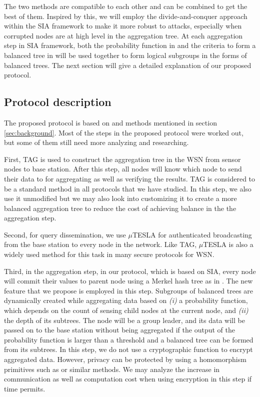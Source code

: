 \documentclass[a4paper]{article}
\begin{document}
The two methods are compatible to each other and can be combined to get the
best of them. Inspired by this, we will employ the divide-and-conquer approach
within the SIA framework to make it more robust to attacks, especially when
corrupted nodes are at high level in the aggregation tree. At each aggregation
step in SIA framework, both the probability function in \cite{Chan06} and the
criteria to form a balanced tree in \cite{SDAP} will be used together to form
logical subgroups in the forms of balanced trees. The next section will give a
detailed explanation of our proposed protocol.

\subsection{Protocol description}

The proposed protocol is based on \cite{Chan06} and methods mentioned
in section \ref{sec:background}. Most of the steps in the proposed protocol
were worked out, but some of them still need more analyzing and researching.

First, TAG \cite{tag} is used to construct the aggregation tree in the WSN
from sensor nodes to base station. After this step, all nodes will know which
node to send their data to for aggregating as well as verifying the
results. TAG is considered to be a standard method in all protocols that we
have studied. In this step, we also use it unmodified but we may also look
into customizing it to create a more balanced aggregation tree to reduce the
cost of achieving balance in the the aggregation step.

Second, for query dissemination, we use $\mu$TESLA \cite{SPINS} for
authenticated broadcasting from the base station to every node in the
network. Like TAG, $\mu$TESLA is also a widely used method for this task in
many secure protocols for WSN.

Third, in the aggregation step, in our protocol, which is based on SIA, every
node will commit their values to parent node using a Merkel hash tree
\cite{Merkel} as in \cite{SIA}. The new feature that we propose is employed in
this step.  Subgroups of balanced trees are dynamically created while
aggregating data based on {\it (i)} a probability function, which depends on
the count of sensing child nodes at the current node, and {\it (ii)} the depth
of its subtrees. The node will be a group leader, and its data will be passed
on to the base station without being aggregated if the output of the
probability function is larger than a threshold and a balanced tree can be
formed from its subtrees. In this step, we do not use a cryptographic function
to encrypt aggregated data. However, privacy can be protected by using a
homomorphism primitives such as \cite{Castel} or similar methods. We may
analyze the increase in communication as well as computation cost when using
encryption in this step if time permits.
\end{document}
